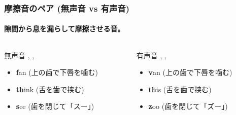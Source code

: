 \documentclass[aspectratio=169,xcolor={dvipsnames,table}]{beamer}
\begin{document}
\begin{frame}
    \frametitle{摩擦音のペア (無声音 vs 有声音)}
    \framesubtitle{隙間から息を漏らして摩擦させる音。}
    \begin{columns}[T,totalwidth=\textwidth]
        \begin{column}{.45\textwidth}
            \begin{alertblock}{無声音 , , }
                \begin{itemize}
                    \item[\textipa{/f/}] \textbf{f}an (上の歯で下唇を噛む)
                    \item[\textipa{/T/}] \textbf{th}ink (舌を歯で挟む)
                    \item[\textipa{/s/}] \textbf{s}ee (歯を閉じて「スー」)
                \end{itemize}
            \end{alertblock}
        \end{column}
        \begin{column}{.45\textwidth}
            \begin{block}{有声音 , , }
                \begin{itemize}
                    \item[\textipa{/v/}] \textbf{v}an (上の歯で下唇を噛む)
                    \item[\textipa{/D/}] \textbf{th}is (舌を歯で挟む)
                    \item[\textipa{/z/}] \textbf{z}oo (歯を閉じて「ズー」)
                \end{itemize}
            \end{block}
        \end{column}
    \end{columns}
\end{frame}
\end{document}
